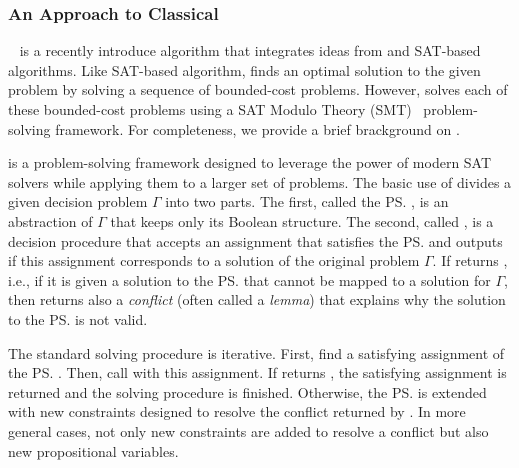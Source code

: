 

\subsubsection{An \smt Approach to Classical \mapf}


\smtcbsO~\cite{DBLP:conf/ijcai/Surynek19} is a recently introduce \mapf algorithm that integrates ideas from \cbs and SAT-based \mapf algorithms. 
Like SAT-based \mapf algorithm, \smtcbsO finds an optimal solution to the given \mapf problem by solving a sequence of bounded-cost \mapf problems. However, \smtcbsO solves each of these bounded-cost problems using a SAT Modulo Theory (SMT)~\cite{DBLP:journals/jacm/NieuwenhuisOT06,DBLP:journals/constraints/BofillPSV12,DBLP:conf/cp/Nieuwenhuis10} 
problem-solving framework. For completeness, we provide a brief brackground on \smt. 


\smt is a problem-solving framework 
designed to leverage the power of modern SAT solvers while applying them to a larger set of problems. 
The basic use of \smt divides a given decision problem $\Gamma$ into two parts. The first, called the \ps, is an abstraction of $\Gamma$ that keeps only its Boolean structure. The second, called \decidet, is a decision procedure that accepts an assignment that satisfies the \ps and outputs \true if this assignment corresponds to a solution of the original problem $\Gamma$. 
If \decidet returns \false, i.e., if it is given a solution to the \ps that cannot be mapped to a solution for $\Gamma$, then \decidet returns also a \emph{conflict}  (often called a {\em lemma}) that explains why the solution to the \ps is not valid. 

The standard \smt solving procedure is iterative. First, find a satisfying assignment of the \ps. 
Then, call \decidet with this assignment. If \decidet returns \true, the satisfying assignment is returned and the \smt solving procedure is finished. 
Otherwise, the \ps is extended with new constraints designed to resolve the conflict returned by \decidet. 
In more general cases, not only new constraints are added to resolve a conflict but also new propositional variables.


